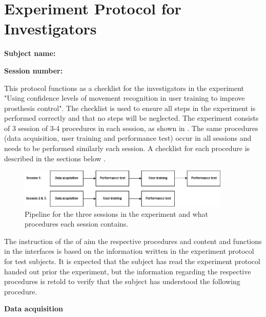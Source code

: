 
\section{Experiment Protocol for Investigators} \label{sec:protocol:investigator}

\textbf{Subject name:} 

\textbf{Session number:}

This protocol functions as a checklist for the investigators in the experiment "Using confidence levels of movement recognition in user training to improve prosthesis control". The checklist is used to ensure all steps in the experiment is performed correctly and that no steps will be neglected. The experiment consists of 3 session of 3-4 procedures in each session, as shown in . The same procedures (data acquisition, user training and performance test) occur in all sessions and needs to be performed similarly each session. A checklist for each procedure is described in the sections below .

\begin{figure}[H]                                         
	\includegraphics[width=0.9\textwidth]{figures/pMethods/experiment_protocol_pipeline}  
	\caption{Pipeline for the three sessions in the experiment and what procedures each session contains.}
	\label{fig:experiment_protocol_pipeline_investigators} 
\end{figure} 

The instruction of the of aim the respective procedures and content and functions in the interfaces is based on the information written in the experiment protocol for test subjects. It is expected that the subject has read the experiment protocol handed out prior the experiment, but the information regarding the respective procedures is retold to verify that the subject has understood the following procedure.

\textbf{\large Data acquisition}

